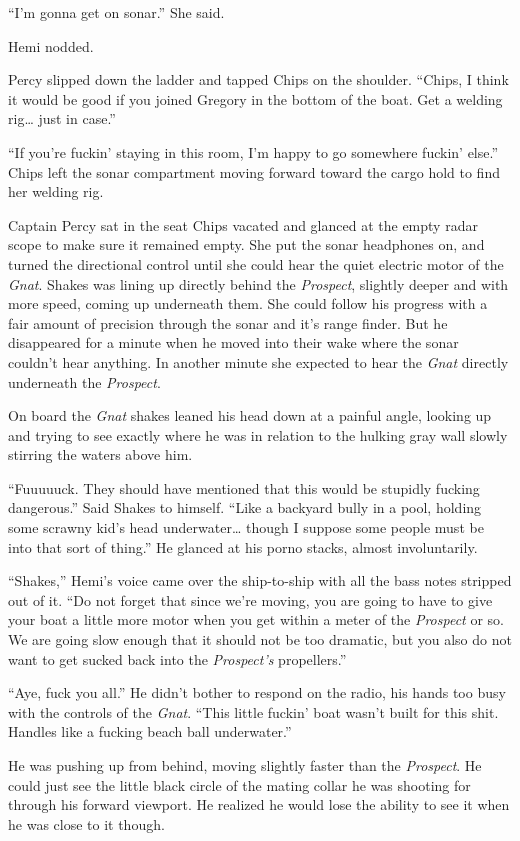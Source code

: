 \documentclass[
]{scrbook}
\begin{document}
``I'm gonna get on sonar.'' She said.

Hemi nodded.

Percy slipped down the ladder and tapped Chips on the shoulder. ``Chips,
I think it would be good if you joined Gregory in the bottom of the
boat. Get a welding rig\ldots{} just in case.''

``If you're fuckin' staying in this room, I'm happy to go somewhere
fuckin' else.'' Chips left the sonar compartment moving forward toward
the cargo hold to find her welding rig.

Captain Percy sat in the seat Chips vacated and glanced at the empty
radar scope to make sure it remained empty. She put the sonar headphones
on, and turned the directional control until she could hear the quiet
electric motor of the \emph{Gnat}. Shakes was lining up directly behind
the \emph{Prospect}, slightly deeper and with more speed, coming up
underneath them. She could follow his progress with a fair amount of
precision through the sonar and it's range finder. But he disappeared
for a minute when he moved into their wake where the sonar couldn't hear
anything. In another minute she expected to hear the \emph{Gnat}
directly underneath the \emph{Prospect}.

On board the \emph{Gnat} shakes leaned his head down at a painful angle,
looking up and trying to see exactly where he was in relation to the
hulking gray wall slowly stirring the waters above him.

``Fuuuuuck. They should have mentioned that this would be stupidly
fucking dangerous.'' Said Shakes to himself. ``Like a backyard bully in
a pool, holding some scrawny kid's head underwater\ldots{} though I
suppose some people must be into that sort of thing.'' He glanced at his
porno stacks, almost involuntarily.

``Shakes,'' Hemi's voice came over the ship-to-ship with all the bass
notes stripped out of it. ``Do not forget that since we're moving, you
are going to have to give your boat a little more motor when you get
within a meter of the \emph{Prospect} or so. We are going slow enough
that it should not be too dramatic, but you also do not want to get
sucked back into the \emph{Prospect's} propellers.''

``Aye, fuck you all.'' He didn't bother to respond on the radio, his
hands too busy with the controls of the \emph{Gnat}. ``This little
fuckin' boat wasn't built for this shit. Handles like a fucking beach
ball underwater.''

He was pushing up from behind, moving slightly faster than the
\emph{Prospect}. He could just see the little black circle of the mating
collar he was shooting for through his forward viewport. He realized he
would lose the ability to see it when he was close to it though.
\end{document}
